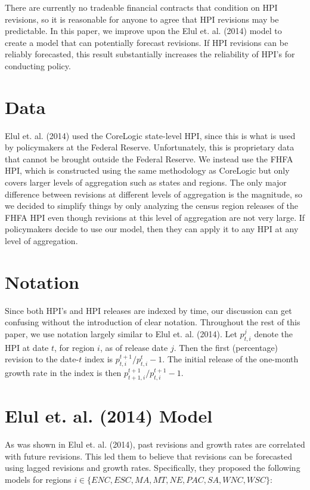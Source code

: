 \documentclass[AER]{AEA}
\begin{document}
There are currently no tradeable financial contracts that condition on HPI revisions, so it is reasonable for anyone to agree that HPI revisions may be predictable. In this paper, we improve upon the Elul et. al. (2014) model to create a model that can potentially forecast revisions. If HPI revisions can be reliably forecasted, this result substantially increases the reliability of HPI's for conducting policy.

\section{Data}

Elul et. al. (2014) used the CoreLogic state-level HPI, since this is what is used by policymakers at the Federal Reserve. Unfortunately, this is proprietary data that cannot be brought outside the Federal Reserve. We instead use the FHFA HPI, which is constructed using the same methodology as CoreLogic but only covers larger levels of aggregation such as states and regions. The only major difference between revisions at different levels of aggregation is the magnitude, so we decided to simplify things by only analyzing the census region releases of the FHFA HPI even though revisions at this level of aggregation are not very large. If policymakers decide to use our model, then they can apply it to any HPI at any level of aggregation.

\section{Notation}

Since both HPI's and HPI releases are indexed by time, our discussion can get confusing without the introduction of clear notation. Throughout the rest of this paper, we use notation largely similar to Elul et. al. (2014). Let $p_{t,i}^j$ denote the HPI at date $t$, for region $i$, as of release date $j$. Then the first (percentage) revision to the date-$t$ index is $p_{t,i}^{t+1}/p_{t,i}^t-1$. The initial release of the one-month growth rate in the index is then $p_{t+1,i}^{t+1}/p_{t,i}^{t+1}-1$. 

\section{Elul et. al. (2014) Model}

As was shown in Elul et. al. (2014), past revisions and growth rates are correlated with future revisions. This led them to believe that revisions can be forecasted using lagged revisions and growth rates. Specifically, they proposed the following models for regions $i \in \lbrace ENC,ESC,MA,MT,NE,PAC,SA,WNC,WSC \rbrace$:
\end{document}
